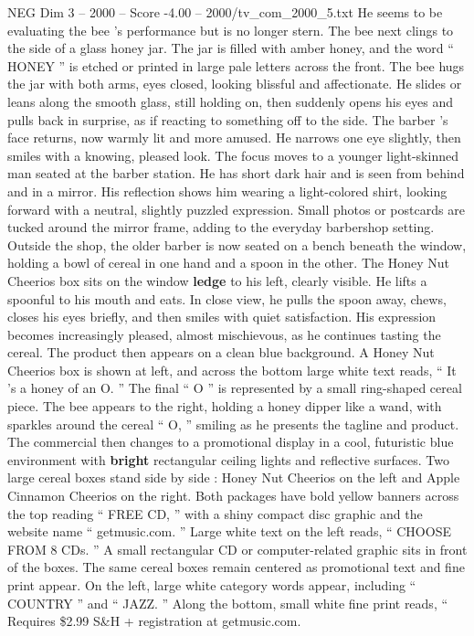 \begin{textsample}{NEG Dim 3 – 2000 – Score -4.00 – 2000/tv\_com\_2000\_5.txt}
He seems to be evaluating the bee ’s performance but is no longer stern.
The bee next clings to the side of a glass honey jar.
The jar is filled with amber honey, and the word “ HONEY ” is etched or printed in large pale letters across the front.
The bee hugs the jar with both arms, eyes closed, looking blissful and affectionate.
He slides or leans along the smooth glass, still holding on, then suddenly opens his eyes and pulls back in surprise, as if reacting to something off to the side.
The barber ’s face returns, now warmly lit and more amused.
He narrows one eye slightly, then smiles with a knowing, pleased look.
The focus moves to a younger light-skinned man seated at the barber station.
He has short dark hair and is seen from behind and in a mirror.
His reflection shows him wearing a light-colored shirt, looking forward with a neutral, slightly puzzled expression.
Small photos or postcards are tucked around the mirror frame, adding to the everyday barbershop setting.
Outside the shop, the older barber is now seated on a bench beneath the window, holding a bowl of cereal in one hand and a spoon in the other.
The Honey Nut Cheerios box sits on the window \textbf{ledge} to his left, clearly visible.
He lifts a spoonful to his mouth and eats.
In close view, he pulls the spoon away, chews, closes his eyes briefly, and then smiles with quiet satisfaction.
His expression becomes increasingly pleased, almost mischievous, as he continues tasting the cereal.
The product then appears on a clean blue background.
A Honey Nut Cheerios box is shown at left, and across the bottom large white text reads, “ It ’s a honey of an O. ” The final “ O ” is represented by a small ring-shaped cereal piece.
The bee appears to the right, holding a honey dipper like a wand, with sparkles around the cereal “ O, ” smiling as he presents the tagline and product.
The commercial then changes to a promotional display in a cool, futuristic blue environment with \textbf{bright} rectangular ceiling lights and reflective surfaces.
Two large cereal boxes stand side by side : Honey Nut Cheerios on the left and Apple Cinnamon Cheerios on the right.
Both packages have bold yellow banners across the top reading “ FREE CD, ” with a shiny compact disc graphic and the website name “ getmusic.com. ” Large white text on the left reads, “ CHOOSE FROM 8 CDs. ” A small rectangular CD or computer-related graphic sits in front of the boxes.
The same cereal boxes remain centered as promotional text and fine print appear.
On the left, large white category words appear, including “ COUNTRY ” and “ JAZZ. ” Along the bottom, small white fine print reads, “ Requires \$2.99 S\&H + registration at getmusic.com.

\end{textsample}
